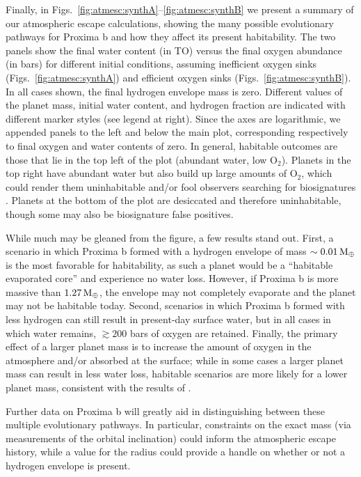 \documentclass[preprint,12pt]{aastex}
\def\mearth{{\rm\,M_\oplus}}
\begin{document}
Finally, in Figs.~\ref{fig:atmesc:synthA}--\ref{fig:atmesc:synthB} we present a summary of our
atmospheric escape calculations, showing the many possible
evolutionary pathways for Proxima b and how they affect its present
habitability. The two panels show the final water content (in TO)
versus the final oxygen abundance (in bars) for different initial
conditions, assuming inefficient oxygen sinks (Figs.~\ref{fig:atmesc:synthA}) and
efficient oxygen sinks (Figs.~\ref{fig:atmesc:synthB}). In all cases shown, the final
hydrogen envelope mass is zero.  Different values of the planet mass,
initial water content, and hydrogen fraction are indicated with
different marker styles (see legend at right). Since the axes are
logarithmic, we appended panels to the left and below the main plot,
corresponding respectively to final oxygen and water contents of
zero. In general, habitable outcomes are those that lie in the top
left of the plot (abundant water, low O$_2$). Planets in the top right
have abundant water but also build up large amounts of O$_2$, which
could render them uninhabitable \citep{LugerBarnes15} and/or fool
observers searching for biosignatures \citep{Schwieterman16}. Planets at the bottom of the
plot are desiccated and therefore uninhabitable, though some may also
be biosignature false positives.

While much may be gleaned from the figure, a few results stand
out. First, a scenario in which Proxima b formed with a hydrogen
envelope of mass $\sim 0.01 \mearth$ is the most favorable for
habitability, as such a planet would be a ``habitable evaporated
core'' \citep{Luger15} and experience no water loss. However, if
Proxima b is more massive than $1.27 \mearth$, the envelope may not
completely evaporate and the planet may not be habitable
today. Second, scenarios in which Proxima b formed with less hydrogen
can still result in present-day surface water, but in all cases in
which water remains, $\gtrsim 200$ bars of oxygen are
retained. Finally, the primary effect of a larger planet mass is to
increase the amount of oxygen in the atmosphere and/or absorbed at the
surface; while in some cases a larger planet mass can result in less
water loss, habitable scenarios are more likely for a lower planet
mass, consistent with the results of \cite{LugerBarnes15}.

Further data on Proxima b will greatly aid in distinguishing between
these multiple evolutionary pathways. In particular, constraints on
the exact mass (via measurements of the orbital inclination) could
inform the atmospheric escape history, while a value for the radius
could provide a handle on whether or not a hydrogen envelope is
present.
\end{document}
